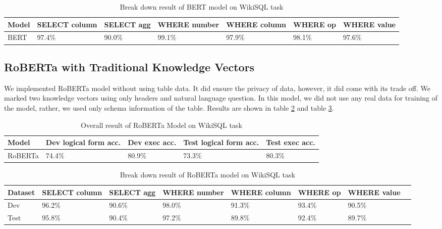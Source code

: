 \documentclass[12pt]{article}
\begin{document}
\begin{table}
\centering
 \begin{tabular}{| m{2cm} | m{2cm}| m{2cm} |m{2cm}| m{2cm} |m{2cm} | m{2cm} |} 
 \hline
 Model  & SELECT column & SELECT agg & WHERE number & WHERE column & WHERE op & WHERE value\\ 
 \hline\hline
 BERT & 97.4\% & 90.0\% & 99.1\% & 97.9\% & 98.1\% &  97.6\% \\ 
 \hline

\end{tabular}
\caption{Break down result of BERT model on WikiSQL task}
\label{berttabledetailed}
\end{table}


\subsection{RoBERTa with Traditional Knowledge Vectors}

We implemented RoBERTa model without using table data. It did ensure the privacy of data, however, it did come with its trade off. We marked two knowledge vectors using only headers and natural language question. In this model, we did not use any real data for training of the model, rather, we used only schema information of the table. Results are shown in table \ref{robertatable} and table \ref{robertatabledetailed}.

 \begin{table}
\centering
 \begin{tabular}{| m{2cm} | m{2cm}| m{2cm} |m{2cm}| m{2cm} |} 
 \hline
Model & Dev logical form acc. & Dev exec acc. & Test logical form acc. & Test exec acc. \\ 
 \hline\hline
  RoBERTa & 74.4\% & 80.9\% & 73.3\% & 80.3\% \\ 
 \hline
\end{tabular}
\caption{Overall result of RoBERTa Model on WikiSQL task}
\label{robertatable}
\end{table}


\begin{table}
\centering
 \begin{tabular}{| m{2cm} | m{2cm}| m{2cm} |m{2cm}| m{2cm} |m{2cm} | m{2cm} |m{2cm} |} 
 \hline
  Dataset & SELECT column & SELECT agg & WHERE number & WHERE column & WHERE op & WHERE value\\ 
 \hline\hline
  Dev & 96.2\% & 90.6\% & 98.0\% & 91.3\% & 93.4\% &  90.5\% \\ 
\hline
 Test & 95.8\% & 90.4\% & 97.2\% & 89.8\% & 92.4\% &  89.7\% \\ 
 \hline

\end{tabular}
\caption{Break down result of RoBERTa model on WikiSQL task}
\label{robertatabledetailed}
\end{table}
\end{document}
